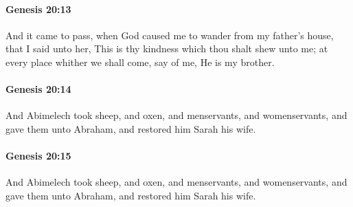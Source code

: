 		\paragraph{Genesis 20:13} %
			\label{GENESIS-20-13}

			And it came to pass, when God caused me to wander from my father's house, that I said unto her, This is thy kindness which thou shalt shew unto me; at every place whither we shall come, say of me, He is my brother.


		\paragraph{Genesis 20:14} %
			\label{GENESIS-20-14}

			And Abimelech took sheep, and oxen, and menservants, and womenservants, and gave them unto Abraham, and restored him Sarah his wife.


		\paragraph{Genesis 20:15} %
			\label{GENESIS-20-15}

			And Abimelech took sheep, and oxen, and menservants, and womenservants, and gave them unto Abraham, and restored him Sarah his wife.



